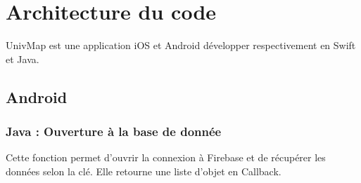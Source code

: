 \documentclass{article}
\begin{document}
\newpage %



\section{Architecture du code}
UnivMap est une application iOS et Android développer respectivement en Swift et Java.


\subsection{Android} %
\label{subsection:Android} 


\subsubsection{Java : Ouverture à la base de donnée}
\label{subsubsection:Java : Ouverture à la base de donnée} 
Cette fonction permet d'ouvrir la connexion à Firebase et de récupérer les données selon la clé. Elle retourne
une liste d'objet en Callback.
\end{document}
